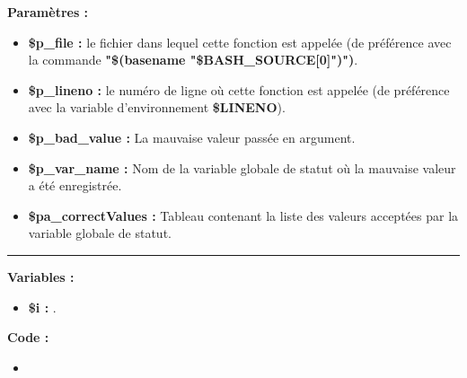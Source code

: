 \documentclass[a4paper,10pt]{article}
\begin{document}
\begin{justify}
    \textbf{Paramètres :}
    \begin{itemize}
        \item \textbf{\color{orange}\$p\_file\color{white} :} le fichier dans lequel cette fonction est appelée (de préférence avec la commande \textbf{\textbf{"\$(\color{gray}basename \color{white}"\color{orange}\$BASH\_SOURCE[0]\color{white}")")}}.\setlength{\parskip}{1em}

        \item \textbf{\color{orange}\$p\_lineno\color{white} :} le numéro de ligne où cette fonction est appelée (de préférence avec la variable d'environnement \textbf{\color{orange}\$LINENO}).

        \item \textbf{\color{orange}\$p\_bad\_value\color{white} :} La mauvaise valeur passée en argument\color{white}.

        \item \textbf{\color{orange}\$p\_var\_name\color{white} :}  Nom de la variable globale de statut où la mauvaise valeur a été enregistrée.\color{white}

        \item \textbf{\color{orange}\$pa\_correctValues\color{white} :} Tableau contenant la liste des valeurs acceptées par la variable globale de statut.
    \end{itemize}
\end{justify}\setlength{\parskip}{2em}

\par\noindent\rule{\textwidth}{0.4pt}

\begin{justify}\setlength{\parskip}{1em}
    \textbf{Variables :}

    \begin{itemize}
        \item \textbf{\color{orange}\$i\color{white} :} .
    \end{itemize}
\end{justify}

\begin{justify}
    \textbf{Code :}
    \begin{itemize}
        \item 
    \end{itemize}

\end{justify}


\end{document}
